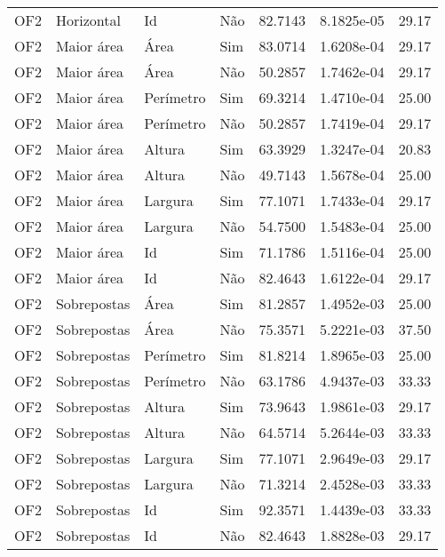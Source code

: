 \begin{tabular}{llllrrr}
OF2       & Horizontal  & Id        & Não         & 82.7143      & 8.1825e-05 & 29.17    \\
OF2       & Maior área  & Área      & Sim         & 83.0714      & 1.6208e-04 & 29.17    \\
OF2       & Maior área  & Área      & Não         & 50.2857      & 1.7462e-04 & 29.17    \\
OF2       & Maior área  & Perímetro & Sim         & 69.3214      & 1.4710e-04 & 25.00    \\
OF2       & Maior área  & Perímetro & Não         & 50.2857      & 1.7419e-04 & 29.17    \\
OF2       & Maior área  & Altura    & Sim         & 63.3929      & 1.3247e-04 & 20.83    \\
OF2       & Maior área  & Altura    & Não         & 49.7143      & 1.5678e-04 & 25.00    \\
OF2       & Maior área  & Largura   & Sim         & 77.1071      & 1.7433e-04 & 29.17    \\
OF2       & Maior área  & Largura   & Não         & 54.7500      & 1.5483e-04 & 25.00    \\
OF2       & Maior área  & Id        & Sim         & 71.1786      & 1.5116e-04 & 25.00    \\
OF2       & Maior área  & Id        & Não         & 82.4643      & 1.6122e-04 & 29.17    \\
OF2       & Sobrepostas & Área      & Sim         & 81.2857      & 1.4952e-03 & 25.00    \\
OF2       & Sobrepostas & Área      & Não         & 75.3571      & 5.2221e-03 & 37.50    \\
OF2       & Sobrepostas & Perímetro & Sim         & 81.8214      & 1.8965e-03 & 25.00    \\
OF2       & Sobrepostas & Perímetro & Não         & 63.1786      & 4.9437e-03 & 33.33    \\
OF2       & Sobrepostas & Altura    & Sim         & 73.9643      & 1.9861e-03 & 29.17    \\
OF2       & Sobrepostas & Altura    & Não         & 64.5714      & 5.2644e-03 & 33.33    \\
OF2       & Sobrepostas & Largura   & Sim         & 77.1071      & 2.9649e-03 & 29.17    \\
OF2       & Sobrepostas & Largura   & Não         & 71.3214      & 2.4528e-03 & 33.33    \\
OF2       & Sobrepostas & Id        & Sim         & 92.3571      & 1.4439e-03 & 33.33    \\
OF2       & Sobrepostas & Id        & Não         & 82.4643      & 1.8828e-03 & 29.17    \\
\hline
\end{tabular}
